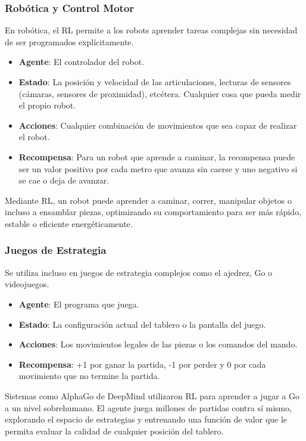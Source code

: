 \documentclass[12pt,a4paper]{book}
\begin{document}
\subsubsection{Robótica y Control Motor}

En robótica, el RL permite a los robots aprender tareas complejas sin necesidad de ser programados explícitamente.

\begin{itemize}
    \item \textbf{Agente}: El controlador del robot.
    \item \textbf{Estado}: La posición y velocidad de las articulaciones, lecturas de sensores (cámaras, sensores de proximidad), etcétera. Cualquier cosa que pueda medir el propio robot.
    \item \textbf{Acciones}: Cualquier combinación de movimientos que sea capaz de realizar el robot.
    \item \textbf{Recompensa}: Para un robot que aprende a caminar, la recompensa puede ser un valor positivo por cada metro que avanza sin caerse y uno negativo si se cae o deja de avanzar.
\end{itemize}

Mediante RL, un robot puede aprender a caminar, correr, manipular objetos o incluso a ensamblar piezas, optimizando su comportamiento para ser más rápido, estable o eficiente energéticamente.

\subsubsection{Juegos de Estrategia}

Se utiliza incluso en juegos de estrategia complejos como el ajedrez, Go o videojuegos.

\begin{itemize}
    \item \textbf{Agente}: El programa que juega.
    \item \textbf{Estado}: La configuración actual del tablero o la pantalla del juego.
    \item \textbf{Acciones}: Los movimientos legales de las piezas o los comandos del mando.
    \item \textbf{Recompensa}: +1 por ganar la partida, -1 por perder y 0 por cada movimiento que no termine la partida.
\end{itemize}

Sistemas como AlphaGo \cite{AlphaGo} de DeepMind utilizaron RL para aprender a jugar a Go a un nivel sobrehumano. El agente juega millones de partidas contra sí mismo, explorando el espacio de estrategias y entrenando una función de valor que le permita evaluar la calidad de cualquier posición del tablero.
\end{document}

